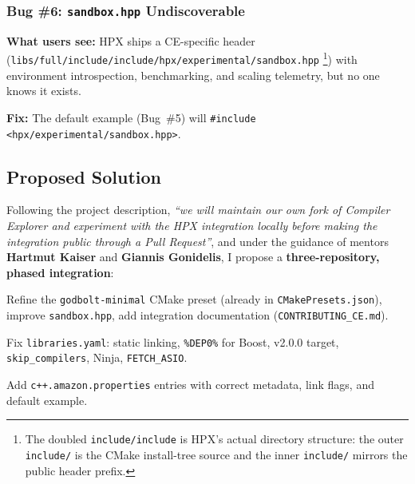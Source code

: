 \documentclass[11pt, a4paper]{article}
\newcommand{\code}[1]{\texttt{#1}}
\newcommand{\cefile}[1]{\texttt{#1}}
\begin{document}
\subsubsection*{Bug \#6: \code{sandbox.hpp} Undiscoverable}

\textbf{What users see:} HPX ships a CE-specific header
(\cefile{libs/full/include/include/hpx/experimental/sandbox.hpp}%
\footnote{The doubled \code{include/include} is HPX's actual directory
structure: the outer \code{include/} is the CMake install-tree source
and the inner \code{include/} mirrors the public header prefix.}) with
environment introspection, benchmarking, and scaling telemetry, but
no one knows it exists.

\textbf{Fix:} The default example (Bug~\#5) will \code{\#include
<hpx/experimental/sandbox.hpp>}.

\subsection*{Proposed Solution}

Following the project description, \textit{``we will maintain our own fork of
Compiler Explorer and experiment with the HPX integration locally before making
the integration public through a Pull Request''}, and under the guidance of
mentors \textbf{Hartmut Kaiser} and \textbf{Giannis Gonidelis}, I propose a
\textbf{three-repository, phased integration}:

\begin{description}[leftmargin=1.5em, itemsep=3pt]
  \item[PR\,\#1: \code{STEllAR-GROUP/hpx}]
    Refine the \code{godbolt-minimal} CMake preset (already in
    \cefile{CMakePresets.json}), improve \code{sandbox.hpp}, add integration
    documentation (\cefile{CONTRIBUTING\_CE.md}).

  \item[PR\,\#2: \code{compiler-explorer/infra}]
    Fix \code{libraries.yaml}: static linking, \code{\%DEP0\%} for Boost,
    v2.0.0 target, \code{skip\_compilers}, Ninja, \code{FETCH\_ASIO}.

  \item[PR\,\#3: \code{compiler-explorer/compiler-explorer}]
    Add \code{c++.amazon.properties} entries with correct metadata, link
    flags, and default example.
\end{description}
\end{document}
